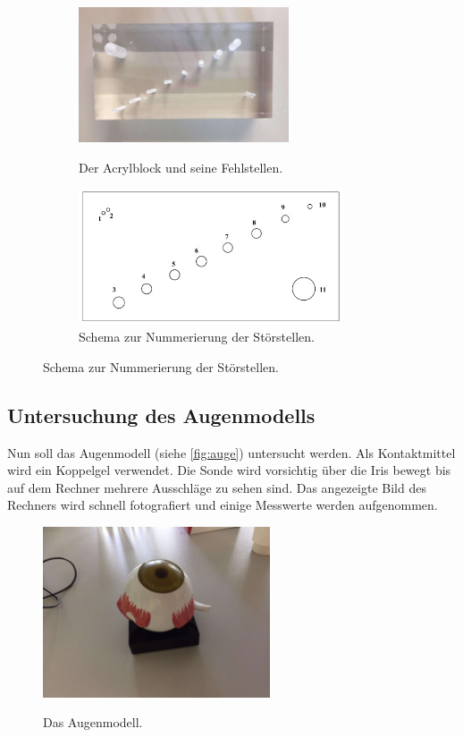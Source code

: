 \begin{figure}
    \begin{subfigure}{0.56\textwidth}
        \centering
        \includegraphics[height=4cm]{content/acrylblock.pdf}
        \caption{Der Acrylblock und seine Fehlstellen.}\cite{anleitung}
        \label{fig:acrylblock}
    \end{subfigure}
\hfill
    \begin{subfigure}{0.40\textwidth}
        \centering
        \includegraphics[height=4cm]{content/schema_block.jpg}
        \caption{Schema zur Nummerierung der Störstellen.} %
        \label{fig:schemablock}
    \end{subfigure}
\end{figure}

\subsection{Untersuchung des Augenmodells}
\label{subsec:auge}
Nun soll das Augenmodell (siehe \autoref{fig:auge}) untersucht werden.
Als Kontaktmittel wird ein Koppelgel verwendet.
Die Sonde wird vorsichtig über die Iris bewegt bis auf dem Rechner mehrere Ausschläge zu sehen sind.
Das angezeigte Bild des Rechners wird schnell fotografiert und einige Messwerte werden aufgenommen.

\begin{figure}
    \centering
    \includegraphics[width=0.6\textwidth]{content/auge.pdf}
    \caption{Das Augenmodell.}\cite{anleitung}
    \label{fig:auge}
\end{figure}